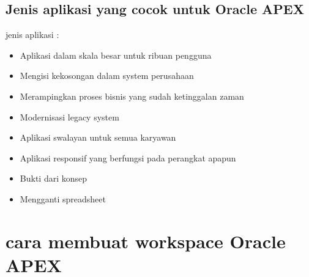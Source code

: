 \documentclass[a4paper,12pt]{report}
\begin{document}
\subsection*{Jenis aplikasi yang cocok untuk Oracle APEX}
jenis aplikasi :
\begin{itemize}
	\item Aplikasi dalam skala besar untuk ribuan pengguna
	\item Mengisi kekosongan dalam system perusahaan
	\item Merampingkan proses bisnis yang sudah ketinggalan zaman
	\item Modernisasi legacy system
	\item Aplikasi swalayan untuk semua karyawan
	\item Aplikasi responsif yang berfungsi pada perangkat apapun
	\item Bukti dari konsep
	\item Mengganti spreadsheet 
\end{itemize}
\section*{cara membuat workspace Oracle APEX}
\end{document}
